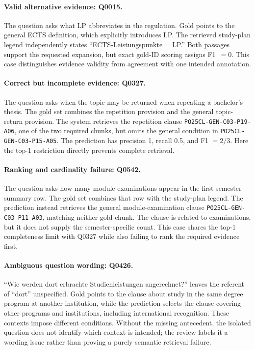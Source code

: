 \documentclass[11pt]{article}
\begin{document}
\paragraph{Valid alternative evidence: Q0015.}
The question asks what LP abbreviates in the regulation. Gold points to the general ECTS definition, which explicitly introduces LP. The retrieved study-plan legend independently states ``ECTS-Leistungspunkte = LP.'' Both passages support the requested expansion, but exact gold-ID scoring assigns F1~$=0$. This case distinguishes evidence validity from agreement with one intended annotation.

\paragraph{Correct but incomplete evidence: Q0327.}
The question asks when the topic may be returned when repeating a bachelor's thesis. The gold set combines the repetition provision and the general topic-return provision. The system retrieves the repetition clause \nolinkurl{PO25CL-GEN-C03-P19-A06}, one of the two required chunks, but omits the general condition in \nolinkurl{PO25CL-GEN-C03-P15-A05}. The prediction has precision 1, recall 0.5, and F1 $=2/3$. Here the top-1 restriction directly prevents complete retrieval.

\paragraph{Ranking and cardinality failure: Q0542.}
The question asks how many module examinations appear in the first-semester summary row. The gold set combines that row with the study-plan legend. The prediction instead retrieves the general module-examination clause \nolinkurl{PO25CL-GEN-C03-P11-A03}, matching neither gold chunk. The clause is related to examinations, but it does not supply the semester-specific count. This case shares the top-1 completeness limit with Q0327 while also failing to rank the required evidence first.

\paragraph{Ambiguous question wording: Q0426.}
``Wie werden dort erbrachte Studienleistungen angerechnet?'' leaves the referent of ``dort'' unspecified. Gold points to the clause about study in the same degree program at another institution, while the prediction selects the clause covering other programs and institutions, including international recognition. These contexts impose different conditions. Without the missing antecedent, the isolated question does not identify which context is intended; the review labels it a wording issue rather than proving a purely semantic retrieval failure.
\end{document}
